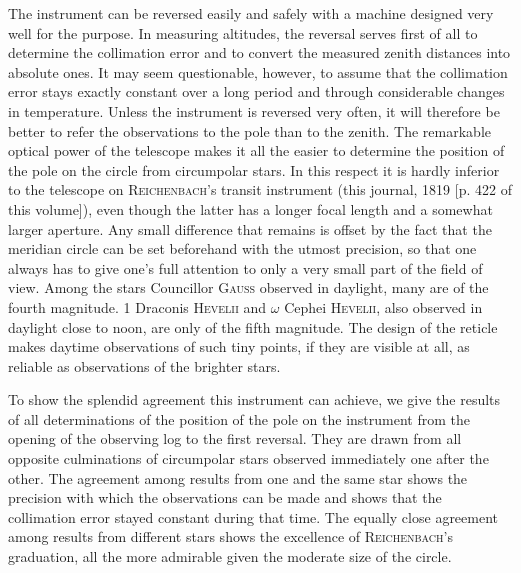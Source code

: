 The instrument can be reversed easily and safely with a machine designed very well for the purpose. In measuring altitudes, the reversal serves first of all to determine the collimation error and to convert the measured zenith distances into absolute ones. It may seem questionable, however, to assume that the collimation error stays exactly constant over a long period and through considerable changes in temperature. Unless the instrument is reversed very often, it will therefore be better to refer the observations to the pole than to the zenith. The remarkable optical power of the telescope makes it all the easier to determine the position of the pole on the circle from circumpolar stars. In this respect it is hardly inferior to the telescope on \textsc{Reichenbach}’s transit instrument (this journal, 1819 [p. 422 of this volume]), even though the latter has a longer focal length and a somewhat larger aperture. Any small difference that remains is offset by the fact that the meridian circle can be set beforehand with the utmost precision, so that one always has to give one’s full attention to only a very small part of the field of view. Among the stars Councillor \textsc{Gauss} observed in daylight, many are of the fourth magnitude. 1 Draconis \textsc{Hevelii} and $\omega$ Cephei \textsc{Hevelii}, also observed in daylight close to noon, are only of the fifth magnitude. The design of the reticle makes daytime observations of such tiny points, if they are visible at all, as reliable as observations of the brighter stars.

To show the splendid agreement this instrument can achieve, we give the results of all determinations of the position of the pole on the instrument from the opening of the observing log to the first reversal. They are drawn from all opposite culminations of circumpolar stars observed immediately one after the other. The agreement among results from one and the same star shows the precision with which the observations can be made and shows that the collimation error stayed constant during that time. The equally close agreement among results from different stars shows the excellence of \textsc{Reichenbach}’s graduation, all the more admirable given the moderate size of the circle.

